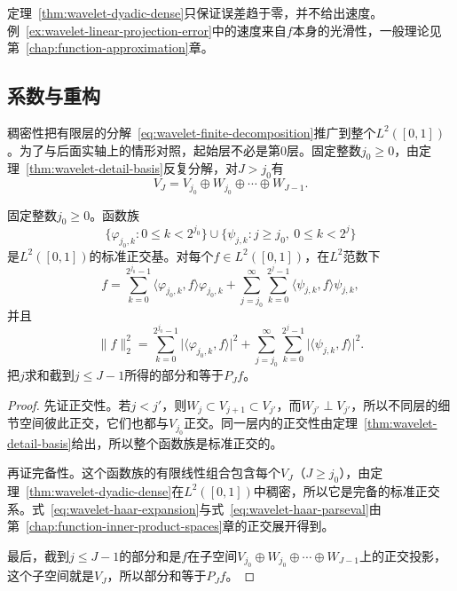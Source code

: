 定理~\ref{thm:wavelet-dyadic-dense}只保证误差趋于零，并不给出速度。例~\ref{ex:wavelet-linear-projection-error}中的速度来自$f$本身的光滑性，一般理论见第~\ref{chap:function-approximation}章。

\subsection{系数与重构}
\label{sec:wavelet-coefficients-reconstruction}

稠密性把有限层的分解~\eqref{eq:wavelet-finite-decomposition}推广到整个$L^2([0,1])$。为了与后面实轴上的情形对照，起始层不必是第$0$层。固定整数$j_0\geq0$，由定理~\ref{thm:wavelet-detail-basis}反复分解，对$J>j_0$有
\[
 V_J=V_{j_0}\oplus W_{j_0}\oplus\cdots\oplus W_{J-1}.
\]

\begin{theorem}[区间上的Haar展开]
\label{thm:wavelet-haar-expansion}
固定整数$j_0\geq0$。函数族
\begin{equation}
 \{\varphi_{j_0,k}:0\leq k<2^{j_0}\}\cup\{\psi_{j,k}:j\geq j_0,\ 0\leq k<2^j\}
 \label{eq:wavelet-haar-basis-family}
\end{equation}
是$L^2([0,1])$的标准正交基。对每个$f\in L^2([0,1])$，在$L^2$范数下
\begin{equation}
 f=\sum_{k=0}^{2^{j_0}-1}\langle\varphi_{j_0,k},f\rangle\varphi_{j_0,k}
 +\sum_{j=j_0}^{\infty}\sum_{k=0}^{2^j-1}\langle\psi_{j,k},f\rangle\psi_{j,k},
 \label{eq:wavelet-haar-expansion}
\end{equation}
并且
\begin{equation}
 \lVert f\rVert_2^2=\sum_{k=0}^{2^{j_0}-1}\lvert\langle\varphi_{j_0,k},f\rangle\rvert^2
 +\sum_{j=j_0}^{\infty}\sum_{k=0}^{2^j-1}\lvert\langle\psi_{j,k},f\rangle\rvert^2.
 \label{eq:wavelet-haar-parseval}
\end{equation}
把$j$求和截到$j\leq J-1$所得的部分和等于$P_Jf$。
\end{theorem}

\begin{proof}
先证正交性。若$j<j'$，则$W_j\subset V_{j+1}\subset V_{j'}$，而$W_{j'}\perp V_{j'}$，所以不同层的细节空间彼此正交，它们也都与$V_{j_0}$正交。同一层内的正交性由定理~\ref{thm:wavelet-detail-basis}给出，所以整个函数族是标准正交的。

再证完备性。这个函数族的有限线性组合包含每个$V_J$（$J\geq j_0$），由定理~\ref{thm:wavelet-dyadic-dense}在$L^2([0,1])$中稠密，所以它是完备的标准正交系。式~\eqref{eq:wavelet-haar-expansion}与式~\eqref{eq:wavelet-haar-parseval}由第~\ref{chap:function-inner-product-spaces}章的正交展开得到。

最后，截到$j\leq J-1$的部分和是$f$在子空间$V_{j_0}\oplus W_{j_0}\oplus\cdots\oplus W_{J-1}$上的正交投影，这个子空间就是$V_J$，所以部分和等于$P_Jf$。
\end{proof}

